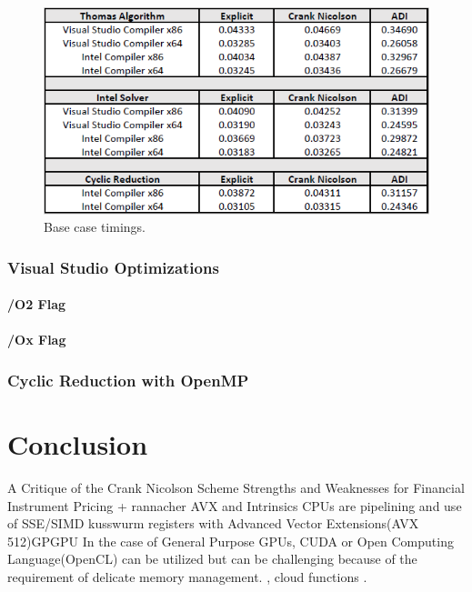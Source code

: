 \documentclass[12pt, oneside]{book}
\theoremstyle{plain}
\theoremstyle{definition}
\begin{document}
\begin{figure}[!htb]
    \centering
        \includegraphics[scale=0.8]{baseCase.png}
    \caption{Base case timings.}
\end{figure}

\subsection{Visual Studio Optimizations}

\subsubsection{/O2 Flag}

\subsubsection{/Ox Flag}

\subsection{Cyclic Reduction with OpenMP} 
 


\chapter{Conclusion}
A Critique of the Crank Nicolson Scheme Strengths and Weaknesses for Financial Instrument Pricing + rannacher 
AVX and Intrinsics CPUs are pipelining and use of SSE/SIMD kusswurm registers with Advanced Vector Extensions(AVX 512)GPGPU In the case of General Purpose GPUs, CUDA or Open Computing Language(OpenCL) can be utilized but can be challenging because of the requirement of delicate memory management. \cite{fpga},  cloud functions \cite{cloudfunc}.
\end{document}
